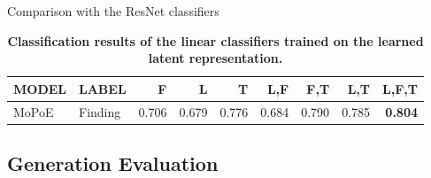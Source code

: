     \begin{frame}{Comparison with the ResNet classifiers}
        \begin{table}
            \centering
            \begin{tabular}{llrrrrrrr}
                MODEL & LABEL   & F     & L     & T     & L,F  & F,T            & L,T   & L,F,T \\
                \midrule
                MoPoE & Finding & 0.706 & 0.679 & 0.776 & 0.684 & 0.790 & 0.785 & \textbf{0.804} \\

            \end{tabular}
            \caption{\textbf{Classification results of the linear classifiers trained on the learned latent representation.}}
        \end{table}

    \end{frame}

%

    \subsection{Generation Evaluation}

